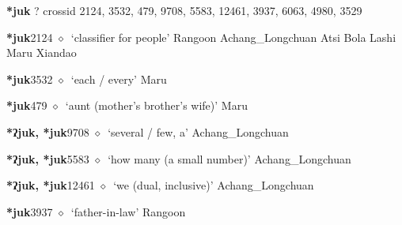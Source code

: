 \item
\textbf{*juk}
?
  {\tiny crossid 2124, 3532, 479, 9708, 5583, 12461, 3937, 6063, 4980, 3529}
  \begin{list}{}{\leftmargin=1.5em \itemindent=-1.5em}
  \item {\footnotesize \textbf{*juk}}{\tiny 2124}
         $\diamond$~`classifier for people'
         Rangoon 
\hspace{1ex}
         Achang\_Longchuan 
\hspace{1ex}
         Atsi 
\hspace{1ex}
         Bola 
\hspace{1ex}
         Lashi 
\hspace{1ex}
         Maru 
\hspace{1ex}
         Xiandao 
  \item {\footnotesize \textbf{*juk}}{\tiny 3532}
\hspace{1ex}
         $\diamond$~`each / every'
         Maru 
  \item {\footnotesize \textbf{*juk}}{\tiny 479}
\hspace{1ex}
         $\diamond$~`aunt (mother's brother's wife)'
         Maru 
  \item {\footnotesize \textbf{*ʔjuk, *juk}}{\tiny 9708}
\hspace{1ex}
         $\diamond$~`several / few, a'
         Achang\_Longchuan 
  \item {\footnotesize \textbf{*ʔjuk, *juk}}{\tiny 5583}
\hspace{1ex}
         $\diamond$~`how many (a small number)'
         Achang\_Longchuan 
  \item {\footnotesize \textbf{*ʔjuk, *juk}}{\tiny 12461}
\hspace{1ex}
         $\diamond$~`we (dual, inclusive)'
         Achang\_Longchuan 
  \item {\footnotesize \textbf{*juk}}{\tiny 3937}
\hspace{1ex}
         $\diamond$~`father-in-law'
         Rangoon 
\hspace{1ex}

\end{list}
